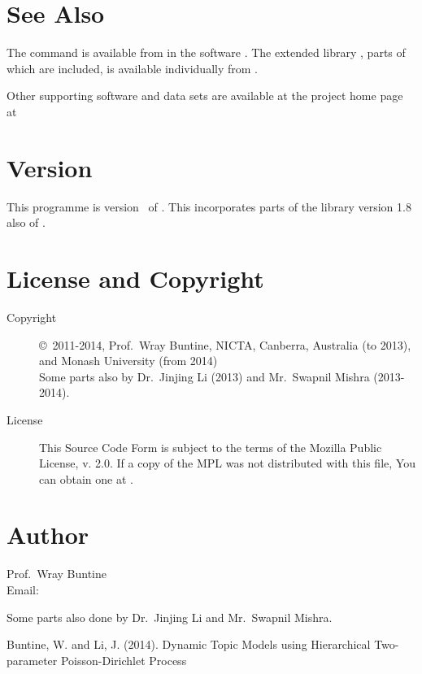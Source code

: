 \documentclass[a4paper,english]{article}
\begin{document}
\section{See Also}


The command  is available from  in 
the software .
The extended library , parts of which are included, is available
individually from .

Other supporting software and data sets are available at the project home
page at\\

\section{Version}

This programme is version \Version\ of \Date.
This incorporates parts of the library  version 1.8
also of \Date.

\section{License and Copyright}

\begin{description}
\item[Copyright] \copyright\ 2011-2014, Prof.~Wray Buntine, 
  NICTA, Canberra, Australia (to 2013), and Monash
University (from 2014)\\
Some parts also by Dr.\ Jinjing Li (2013) and 
Mr.\ Swapnil Mishra (2013-2014).

\item[License]  This Source Code Form is subject to the terms of the Mozilla 
 Public License, v. 2.0. If a copy of the MPL was not
 distributed with this file, You can obtain one at
      .
\end{description}

\section{Author}

\noindent
Prof.~Wray Buntine                     \\
Email:   

Some parts also done by Dr.\ Jinjing Li and 
Mr.\ Swapnil Mishra.

\LatexManEnd

\begin{thebibliography}{breitestes Label}
Buntine, W. and Li, J. (2014). Dynamic Topic Models using Hierarchical
Two-parameter Poisson-Dirichlet Process
\end{thebibliography}
\end{document}
